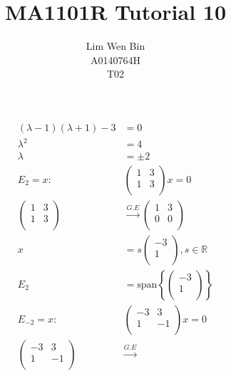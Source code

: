 \documentclass[12pt]{article}
\newenvironment{problem}[2][Problem]{\begin{trivlist}
\item[\hskip \labelsep {\bfseries #1}\hskip \labelsep {\bfseries #2.}]}{\end{trivlist}}
\begin{document}
\title{MA1101R Tutorial 10}
\author{Lim Wen Bin \\
A0140764H\\
T02}
\maketitle

\begin{problem}{1.a}
\end{problem}
\begin{align*}
(\lambda - 1)(\lambda + 1) - 3 &= 0\\
\lambda^2 &= 4\\
\lambda &= \pm 2\\
E_2 = x :
&\left( \begin{array}{cc}
1 & 3\\
1 & 3\\
\end{array} \right) x = 0 \\
\left( \begin{array}{cc}
1 & 3\\
1 & 3\\
\end{array} \right)
&\xrightarrow{G.E}
\left( \begin{array}{cc}
1 & 3\\
0 & 0\\
\end{array} \right)\\
x &= 
s\left( \begin{array}{c}
-3\\
1\\
\end{array} \right) , s \in \mathbb{R}\\
E_2 &= \text{span}\left\{
\left( \begin{array}{c}
-3\\
1\\
\end{array} \right) \right\} \\
E_{-2} = x :
&\left( \begin{array}{cc}
-3 & 3\\
1 & -1\\
\end{array} \right) x = 0 \\
\left( \begin{array}{cc}
-3 & 3\\
1 & -1\\
\end{array} \right)
&\xrightarrow{G.E}

\end{align*}
\end{document}
